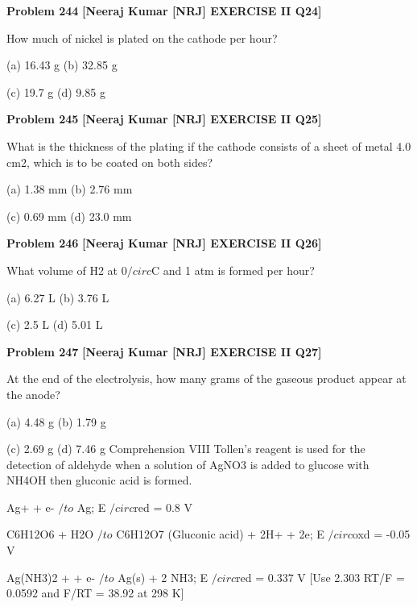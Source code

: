 \begin{problembox}
\textbf{Problem 244} \hfill \textbf{[Neeraj Kumar [NRJ] EXERCISE II Q24]}
\label{q:ext-nrj_all_questions-244}

How much of nickel is plated on the cathode per 
hour?
 
 (a) 16.43 g 
(b) 32.85 g
 
 (c) 19.7 g 
(d) 9.85 g
\end{problembox}

\begin{problembox}
\textbf{Problem 245} \hfill \textbf{[Neeraj Kumar [NRJ] EXERCISE II Q25]}
\label{q:ext-nrj_all_questions-245}

What is the thickness of the plating if the cathode 
consists of a sheet of metal 4.0 cm2, which is to be 
coated on both sides?
 
 (a) 1.38 mm 
(b) 2.76 mm
 
 (c) 0.69 mm 
(d) 23.0 mm
\end{problembox}

\begin{problembox}
\textbf{Problem 246} \hfill \textbf{[Neeraj Kumar [NRJ] EXERCISE II Q26]}
\label{q:ext-nrj_all_questions-246}

What volume of H2 at 0$/circ$C and 1 atm is formed per 
hour?
 
 (a) 6.27 L 
(b) 3.76 L
 
 (c) 2.5 L 
(d) 5.01 L
\end{problembox}

\begin{problembox}
\textbf{Problem 247} \hfill \textbf{[Neeraj Kumar [NRJ] EXERCISE II Q27]}
\label{q:ext-nrj_all_questions-247}

At the end of the electrolysis, how many grams of 
the gaseous product appear at the anode?
 
 (a) 4.48 g 
(b) 1.79 g
 
 (c) 2.69 g 
(d) 7.46 g
Comprehension VIII
Tollen's reagent is used for the detection of aldehyde when a solution of AgNO3 is added to glucose with NH4OH then 
gluconic acid is formed.
 
 Ag+ + e- $/to$ Ag; E $/circ$red = 0.8 V
 
 C6H12O6 + H2O $/to$ C6H12O7 (Gluconic acid) + 2H+ + 2e; E $/circ$oxd = -0.05 V
 
 Ag(NH3)2
+ + e- $/to$ Ag(s) + 2 NH3; E $/circ$red = 0.337 V
[Use 2.303 RT/F = 0.0592 and F/RT = 38.92 at 298 K]
\end{problembox}

